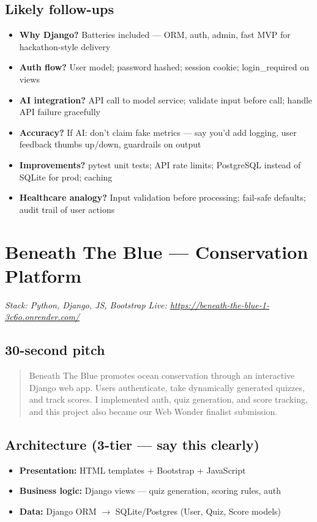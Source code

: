 \documentclass[11pt,a4paper]{article}
\newcommand{\Say}[1]{\begin{quote}\small #1\end{quote}}
\begin{document}
\subsection{Likely follow-ups}
\begin{itemize}
  \item \textbf{Why Django?} Batteries included --- ORM, auth, admin, fast MVP for hackathon-style delivery
  \item \textbf{Auth flow?} User model; password hashed; session cookie; login\_required on views
  \item \textbf{AI integration?} API call to model service; validate input before call; handle API failure gracefully
  \item \textbf{Accuracy?} If AI: don't claim fake metrics --- say you'd add logging, user feedback thumbs up/down, guardrails on output
  \item \textbf{Improvements?} pytest unit tests; API rate limits; PostgreSQL instead of SQLite for prod; caching
  \item \textbf{Healthcare analogy?} Input validation before processing; fail-safe defaults; audit trail of user actions
\end{itemize}

\section{Beneath The Blue --- Conservation Platform}
\textit{Stack: Python, Django, JS, Bootstrap \textbar{} Live: \url{https://beneath-the-blue-1-3c6o.onrender.com/}}

\subsection{30-second pitch}
\Say{Beneath The Blue promotes ocean conservation through an interactive Django web app. Users authenticate, take dynamically generated quizzes, and track scores. I implemented auth, quiz generation, and score tracking, and this project also became our Web Wonder finalist submission.}

\subsection{Architecture (3-tier --- say this clearly)}
\begin{itemize}
  \item \textbf{Presentation:} HTML templates + Bootstrap + JavaScript
  \item \textbf{Business logic:} Django views --- quiz generation, scoring rules, auth
  \item \textbf{Data:} Django ORM $\rightarrow$ SQLite/Postgres (User, Quiz, Score models)
\end{itemize}
\end{document}

